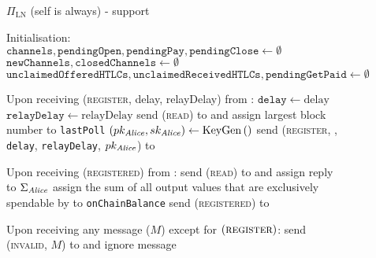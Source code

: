 \begin{figure}[H] %
  \begin{protocolbox}{$\Pi_{\mathrm{LN}}$ (self is \alice{} always) - support}
    \begin{algorithmic}[1]
      \State Initialisation:
      \Indent
        \State $\mathtt{channels}, \mathtt{pendingOpen}, \mathtt{pendingPay},
        \mathtt{pendingClose} \gets \emptyset$
        \State $\mathtt{newChannels}, \mathtt{closedChannels} \gets \emptyset$
        \State $\mathtt{unclaimedOfferedHTLCs}, \mathtt{unclaimedReceivedHTLCs},
        \mathtt{pendingGetPaid} \gets \emptyset$
      \EndIndent
      \State

      \State Upon receiving (\textsc{register}, delay, relayDelay) from
      \environment:
      \Indent
        \State $\mathtt{delay} \gets \mathrm{delay}$
        \label{alg:protocol:support:delay}
        \State $\mathtt{relayDelay} \gets \mathrm{relayDelay}$
        \State send (\textsc{read}) to \ledger{} and assign largest block number
        to \texttt{lastPoll}
        \label{alg:protocol:support:lastpoll}
        \State $\left(pk_{\mathit{Alice}}, sk_{\mathit{Alice}}\right) \gets
        \mathrm{KeyGen}\left(\right)$
        \label{alg:protocol:support:keygen}
        \State send (\textsc{register}, \alice, \texttt{delay},
        \texttt{relayDelay}, $pk_{\mathit{Alice}}$) to \environment
      \EndIndent
      \State

      \State Upon receiving (\textsc{registered}) from \environment:
      \Indent
        \State send (\textsc{read}) to \ledger{} and assign reply to
        $\Sigma_{\mathit{Alice}}$
        \State assign the sum of all output values that are exclusively
        spendable by \alice{} to \texttt{onChainBalance}
        \State send (\textsc{registered}) to \environment
      \EndIndent
      \State

      \State Upon receiving any message ($M$) except for
      $\left(\textsc{register}\right)$:
      \Indent
          \State send (\textsc{invalid}, $M$) to \environment{} and ignore
          message
        \EndIf
      \EndIndent
      \State


\end{algorithmic}
\end{protocolbox}
\end{figure}
